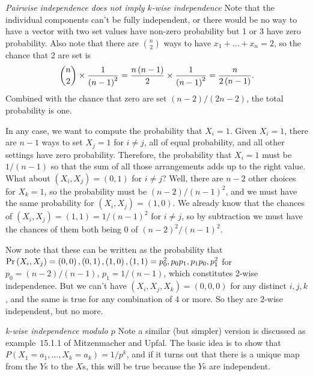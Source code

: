  {\it Pairwise independence does not imply $k$-wise independence}\hfil\break
Note that the individual components can't be fully independent, or there would be no way to have a vector
with two set values have non-zero probability but 1 or 3 have zero probability.
Also note that there are $n \choose 2$ ways to have $x_1 + \ldots + x_n = 2$,
so the chance that 2 are set is 
$$
{n \choose 2} \times {1 \over \left(n - 1\right)^2} =
{n \left(n - 1\right) \over 2} \times {1 \over \left(n - 1\right)^2} = {n \over 2 \left(n - 1\right)}.
$$
Combined with the chance that zero are set $\left(n - 2\right) / \left(2 n - 2\right)$,
the total probability is one.

In any case, we want to compute the probability that $X_i = 1$.  Given $X_i = 1$, there are $n - 1$
ways to set $X_j = 1$ for $i \neq j$, all of equal probability, and all other settings have zero probability.
Therefore, the probability that $X_i = 1$ must be $1 / \left(n - 1\right)$ so that the sum of
all those arrangements adds up to the right value.  What about $\left(X_i, X_j\right) = \left(0, 1\right)$ 
for $i \neq j$? Well, there are $n-2$ other choices for $X_k = 1$, so the probability
must be $\left(n - 2 \right) / \left(n - 1\right)^2$, and we must have the same probability
for $\left(X_i, X_j\right) = \left(1, 0\right)$.  We already know that the chances of
$\left(X_i, X_j\right) = \left(1, 1\right) = 1 / \left(n - 1\right)^2$ for $i \neq j$,
so by subtraction we must have the chances of them both being 0 of
$\left(n - 2\right)^2 / \left(n - 1\right)^2$.

Now note that these can be written as the probability that ${\rm Pr} \left(X_i, X_j\right) = 
\left(0, 0\right), \left(0, 1\right), \left(1, 0\right), \left(1, 1\right) =
p_0^2, p_0 p_1, p_1 p_0, p_1^2$ for $p_0 = {\left( n - 2\right) / \left(n - 1\right)}$,
$p_1 = 1 / \left(n - 1\right)$, which constitutes 2-wise independence.
But we can't have $\left(X_i, X_j, X_k\right) = \left(0, 0, 0\right)$ for any distinct
$i, j, k$, and the same is true for any combination of 4 or more.  So they are 2-wise
independent, but no more.

 {\it k-wise independence modulo $p$}\hfil\break
Note a similar (but simpler) version is discussed as example~15.1.1 of Mitzenmacher and Upfal.
The basic idea is to show that $P\left(X_1 = a_1, \dots, X_k = a_k\right) = 1 / p^k$, and if it turns
out that there is a unique map from the $Y$s to the $X$s, this will be true because the $Y$s are
independent.

